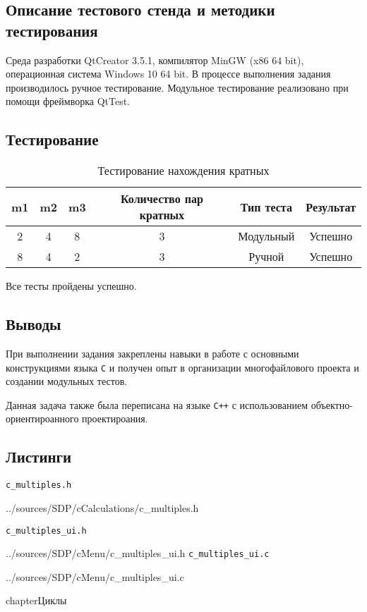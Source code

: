 \documentclass[12pt,a4paper]{report}
\begin{document}
\subsection{Описание тестового стенда и методики тестирования}
\hspace{\parindent}Среда разработки QtCreator 3.5.1, компилятор MinGW (x86 64 bit), операционная система Windows 10 64 bit.
В процессе выполнения задания производилось ручное тестирование.
Модульное тестирование реализовано при помощи фреймворка QtTest.

\subsection{Тестирование}
\begin{table}[h]
\caption{Тестирование нахождения кратных}
\label{multiples_test}
\begin{tabular}{| c c c | c | c | c |}
\hline 
m1 & m2 & m3 & Количество пар кратных & Тип теста & Результат \\ 
\hline 
2 & 4 & 8 & 3 & Модульный & Успешно \\ 
\hline 
8 & 4 & 2 & 3 & Ручной & Успешно \\ 
\hline 
\end{tabular} 
\end{table}
Все тесты пройдены успешно.

\subsection{Выводы}
\hspace{\parindent}При выполнении задания закреплены навыки в работе с основными конструкциями языка \verb+C+ и получен опыт в организации многофайлового проекта и создании модульных тестов.

Данная задача также была переписана на языке \verb|C++| с использованием объектно-ориентироанного проектироания.
\newpage
\subsection{Листинги}
\verb+c_multiples.h+

{../sources/SDP/cCalculations/c_multiples.h}

\verb+c_multiples_ui.h+

{../sources/SDP/cMenu/c_multiples_ui.h}
\verb+c_multiples_ui.c+

{../sources/SDP/cMenu/c_multiples_ui.c}




\newpage
chapter{Циклы}
\end{document}
